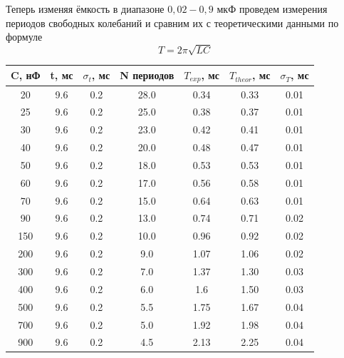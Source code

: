 \documentclass[a4paper,12pt]{article} %
\begin{document}
Теперь изменяя ёмкость в диапазоне $0,02 - 0,9$ мкФ проведем измерения периодов свободных колебаний и сравним их с теоретическими данными по формуле 
\[T = 2 \pi \sqrt{LC}\]

\begin{table}[]
\begin{center}
\begin{tabular}{|c|c|c|c|c|c|c|}
\hline
C, нФ & t, мс & $\sigma_t$, мс & N периодов & $T_{exp}$, мс & $T_{theor}$, мс & $\sigma_T$, мс \\ \hline
20    & 9.6   & 0.2   & 28.0       & 0.34  & 0.33  & 0.01  \\ \hline
25    & 9.6   & 0.2   & 25.0       & 0.38  & 0.37  & 0.01  \\ \hline
30    & 9.6   & 0.2   & 23.0       & 0.42  & 0.41  & 0.01  \\ \hline
40    & 9.6   & 0.2   & 20.0       & 0.48  & 0.47  & 0.01  \\ \hline
50    & 9.6   & 0.2   & 18.0       & 0.53  & 0.53  & 0.01  \\ \hline
60    & 9.6   & 0.2   & 17.0       & 0.56  & 0.58  & 0.01  \\ \hline
70    & 9.6   & 0.2   & 15.0       & 0.64  & 0.63  & 0.01  \\ \hline
90    & 9.6   & 0.2   & 13.0       & 0.74  & 0.71  & 0.02  \\ \hline
150   & 9.6   & 0.2   & 10.0       & 0.96  & 0.92  & 0.02  \\ \hline
200   & 9.6   & 0.2   & 9.0        & 1.07  & 1.06  & 0.02  \\ \hline
300   & 9.6   & 0.2   & 7.0        & 1.37  & 1.30  & 0.03  \\ \hline
400   & 9.6   & 0.2   & 6.0        & 1.6   & 1.50  & 0.03  \\ \hline
500   & 9.6   & 0.2   & 5.5        & 1.75  & 1.67  & 0.04  \\ \hline
700   & 9.6   & 0.2   & 5.0        & 1.92  & 1.98  & 0.04  \\ \hline
900   & 9.6   & 0.2   & 4.5        & 2.13  & 2.25  & 0.04  \\ \hline
\end{tabular}
\end{center}
\end{table}
\end{document}
